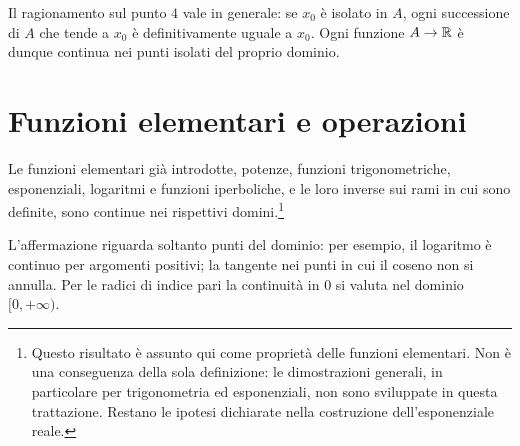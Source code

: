 Il ragionamento sul punto $4$ vale in generale: se $x_0$ è isolato in $A$, ogni successione di $A$ che tende a $x_0$ è definitivamente uguale a $x_0$. Ogni funzione $A\to\mathbb{R}$ è dunque continua nei punti isolati del proprio dominio.

\section{Funzioni elementari e operazioni}

\begin{teorema}
\label{teo:continuita-elementari}
Le funzioni elementari già introdotte, potenze, funzioni trigonometriche, esponenziali, logaritmi e funzioni iperboliche, e le loro inverse sui rami in cui sono definite, sono continue nei rispettivi domini.\footnote{Questo risultato è assunto qui come proprietà delle funzioni elementari. Non è una conseguenza della sola definizione: le dimostrazioni generali, in particolare per trigonometria ed esponenziali, non sono sviluppate in questa trattazione. Restano le ipotesi dichiarate nella costruzione dell'esponenziale reale.}
\end{teorema}

L'affermazione riguarda soltanto punti del dominio: per esempio, il logaritmo è continuo per argomenti positivi; la tangente nei punti in cui il coseno non si annulla. Per le radici di indice pari la continuità in $0$ si valuta nel dominio $[0,+\infty)$.

